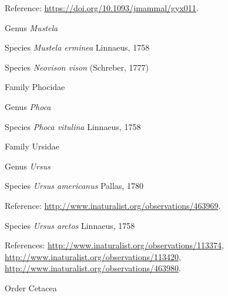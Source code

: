 \documentclass[9pt, article]{memoir}
\begin{document}
\begin{multicols}{2}
\vspace{6pt}Reference: 
\url{https://doi.org/10.1093/jmammal/gyx011}.

\vspace{6pt}\noindent\hspace{30pt}Genus \textit{Mustela}


\vspace{6pt}\noindent\hspace{36pt}Species \textit{Mustela erminea} Linnaeus, 1758


\vspace{6pt}\noindent\hspace{36pt}Species \textit{Neovison vison} (Schreber, 1777)


\vspace{6pt}\noindent\hspace{24pt}Family Phocidae


\vspace{6pt}\noindent\hspace{30pt}Genus \textit{Phoca}


\vspace{6pt}\noindent\hspace{36pt}Species \textit{Phoca vitulina} Linnaeus, 1758


\vspace{6pt}\noindent\hspace{24pt}Family Ursidae


\vspace{6pt}\noindent\hspace{30pt}Genus \textit{Ursus}


\vspace{6pt}\noindent\hspace{36pt}Species \textit{Ursus americanus} Pallas, 1780


\vspace{6pt}Reference: 
\url{http://www.inaturalist.org/observations/463969}.

\vspace{6pt}\noindent\hspace{36pt}Species \textit{Ursus arctos} Linnaeus, 1758


\vspace{6pt}References: 
\url{http://www.inaturalist.org/observations/113374}, 
\url{http://www.inaturalist.org/observations/113420}, 
\url{http://www.inaturalist.org/observations/463980}.

\vspace{6pt}\noindent\hspace{18pt}Order Cetacea



\end{multicols}
\end{document}
